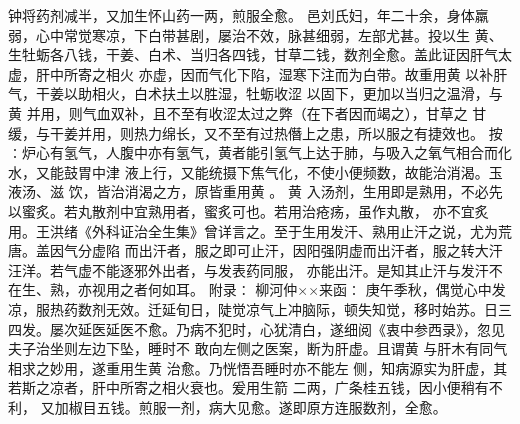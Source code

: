 \documentclass[a4paper,12pt,UTF8,twoside]{ctexbook}
\begin{document}
钟将药剂减半，又加生怀山药一两，煎服全愈。 
邑刘氏妇，年二十余，身体羸弱，心中常觉寒凉，下白带甚剧，屡治不效，脉甚细弱，左部尤甚。投以生 
黄、生牡蛎各八钱，干姜、白术、当归各四钱，甘草二钱，数剂全愈。盖此证因肝气太虚，肝中所寄之相火 
亦虚，因而气化下陷，湿寒下注而为白带。故重用黄 以补肝气，干姜以助相火，白术扶土以胜湿，牡蛎收涩 
以固下，更加以当归之温滑，与黄 并用，则气血双补，且不至有收涩太过之弊（在下者因而竭之），甘草之 
甘缓，与干姜并用，则热力绵长，又不至有过热僭上之患，所以服之有捷效也。 
按∶炉心有氢气，人腹中亦有氢气，黄者能引氢气上达于肺，与吸入之氧气相合而化水，又能鼓胃中津 
液上行，又能统摄下焦气化，不使小便频数，故能治消渴。玉液汤、滋 饮，皆治消渴之方，原皆重用黄 。 
黄 入汤剂，生用即是熟用，不必先以蜜炙。若丸散剂中宜熟用者，蜜炙可也。若用治疮疡，虽作丸散， 
亦不宜炙用。王洪绪《外科证治全生集》曾详言之。至于生用发汗、熟用止汗之说，尤为荒唐。盖因气分虚陷 
而出汗者，服之即可止汗，因阳强阴虚而出汗者，服之转大汗汪洋。若气虚不能逐邪外出者，与发表药同服， 
亦能出汗。是知其止汗与发汗不在生、熟，亦视用之者何如耳。 
附录∶ 
柳河仲××来函∶ 
庚午季秋，偶觉心中发凉，服热药数剂无效。迁延旬日，陡觉凉气上冲脑际，顿失知觉，移时始苏。日三 
四发。屡次延医延医不愈。乃病不犯时，心犹清白，遂细阅《衷中参西录》，忽见夫子治坐则左边下坠，睡时不 
敢向左侧之医案，断为肝虚。且谓黄 与肝木有同气相求之妙用，遂重用生黄 治愈。乃恍悟吾睡时亦不能左 
侧，知病源实为肝虚，其若斯之凉者，肝中所寄之相火衰也。爰用生箭 二两，广条桂五钱，因小便稍有不利， 
又加椒目五钱。煎服一剂，病大见愈。遂即原方连服数剂，全愈。 
\end{document}
